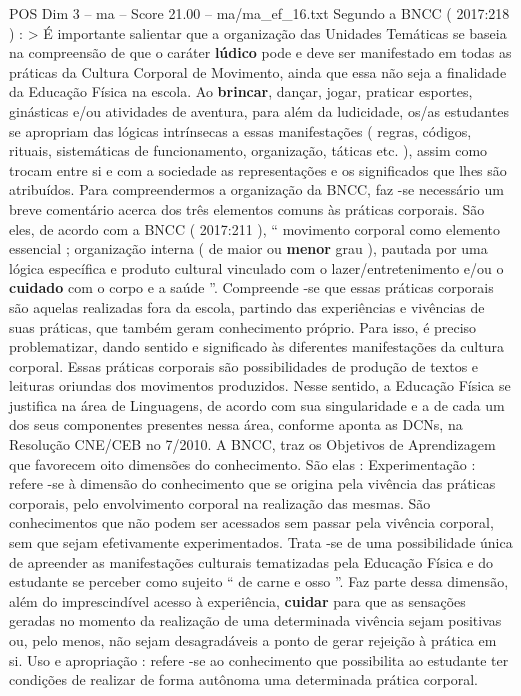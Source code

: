 \begin{textsample}{POS Dim 3 – ma – Score 21.00 – ma/ma\_ef\_16.txt}
Segundo a BNCC ( 2017:218 ) : > É importante salientar que a organização das Unidades Temáticas se baseia na compreensão de que o caráter \textbf{lúdico} pode e deve ser manifestado em todas as práticas da Cultura Corporal de Movimento, ainda que essa não seja a finalidade da Educação Física na escola.
Ao \textbf{brincar}, dançar, jogar, praticar esportes, ginásticas e/ou atividades de aventura, para além da ludicidade, os/as estudantes se apropriam das lógicas intrínsecas a essas manifestações ( regras, códigos, rituais, sistemáticas de funcionamento, organização, táticas etc. ), assim como trocam entre si e com a sociedade as representações e os significados que lhes são atribuídos.
Para compreendermos a organização da BNCC, faz -se necessário um breve comentário acerca dos três elementos comuns às práticas corporais.
São eles, de acordo com a BNCC ( 2017:211 ), “ movimento corporal como elemento essencial ; organização interna ( de maior ou \textbf{menor} grau ), pautada por uma lógica específica e produto cultural vinculado com o lazer/entretenimento e/ou o \textbf{cuidado} com o corpo e a saúde ”.
Compreende -se que essas práticas corporais são aquelas realizadas fora da escola, partindo das experiências e vivências de suas práticas, que também geram conhecimento próprio.
Para isso, é preciso problematizar, dando sentido e significado às diferentes manifestações da cultura corporal.
Essas práticas corporais são possibilidades de produção de textos e leituras oriundas dos movimentos produzidos.
Nesse sentido, a Educação Física se justifica na área de Linguagens, de acordo com sua singularidade e a de cada um dos seus componentes presentes nessa área, conforme aponta as DCNs, na Resolução CNE/CEB no 7/2010.
A BNCC, traz os Objetivos de Aprendizagem que favorecem oito dimensões do conhecimento.
São elas : Experimentação : refere -se à dimensão do conhecimento que se origina pela vivência das práticas corporais, pelo envolvimento corporal na realização das mesmas.
São conhecimentos que não podem ser acessados sem passar pela vivência corporal, sem que sejam efetivamente experimentados.
Trata -se de uma possibilidade única de apreender as manifestações culturais tematizadas pela Educação Física e do estudante se perceber como sujeito “ de carne e osso ”.
Faz parte dessa dimensão, além do imprescindível acesso à experiência, \textbf{cuidar} para que as sensações geradas no momento da realização de uma determinada vivência sejam positivas ou, pelo menos, não sejam desagradáveis a ponto de gerar rejeição à prática em si.
Uso e apropriação : refere -se ao conhecimento que possibilita ao estudante ter condições de realizar de forma autônoma uma determinada prática corporal.

\end{textsample}
